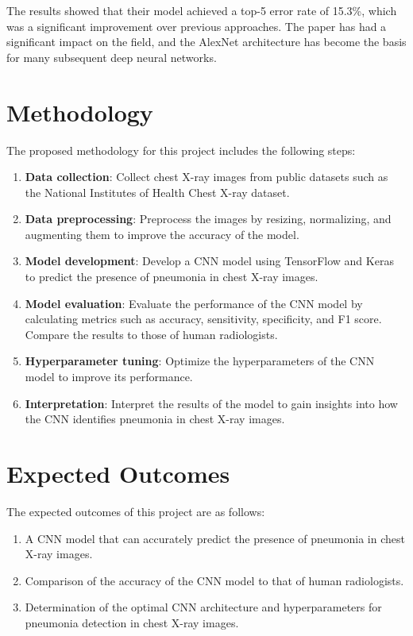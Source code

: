 \documentclass[11pt,a4paper]{article}
\begin{document}
\noindent The results showed that their model achieved a top-5 error rate of 15.3\%, which was a significant improvement over previous approaches. The paper has had a significant impact on the field, and the AlexNet architecture has become the basis for many subsequent deep neural networks. \cite {ronneberger2015unet}


\section*{Methodology}

\noindent The proposed methodology for this project includes the following steps:

\begin{enumerate}
\item \textbf{Data collection}: Collect chest X-ray images from public datasets such as the National Institutes of Health Chest X-ray dataset.
\item \textbf{Data preprocessing}: Preprocess the images by resizing, normalizing, and augmenting them to improve the accuracy of the model.
\item \textbf{Model development}: Develop a CNN model using TensorFlow and Keras to predict the presence of pneumonia in chest X-ray images.
\item \textbf{Model evaluation}: Evaluate the performance of the CNN model by calculating metrics such as accuracy, sensitivity, specificity, and F1 score. Compare the results to those of human radiologists.
\item \textbf{Hyperparameter tuning}: Optimize the hyperparameters of the CNN model to improve its performance.
\item \textbf{Interpretation}: Interpret the results of the model to gain insights into how the CNN identifies pneumonia in chest X-ray images.
\end{enumerate}


\section*{Expected Outcomes}

\noindent The expected outcomes of this project are as follows:

\begin{enumerate}
\item A CNN model that can accurately predict the presence of pneumonia in chest X-ray images.
\item Comparison of the accuracy of the CNN model to that of human radiologists.
\item Determination of the optimal CNN architecture and hyperparameters for pneumonia detection in chest X-ray images.
\end{enumerate}
\end{document}
